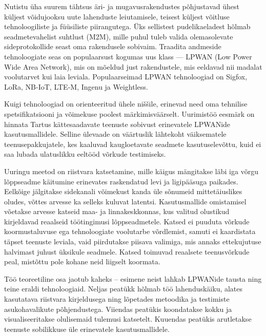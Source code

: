 \documentclass[12pt]{article}
\newcommand{\TODO}{\todo[inline]}
\begin{document}
Nutistu üha suurem tähtsus äri- ja mugavusrakendustes põhjustavad ühest küljest võidujooksu uute lahenduste leiutamisele, teisest küljest võitluse tehnoloogiliste ja füüsiliste piirangutega.
Üks sellistest pudelikaeladest hõlmab seadmetevahelist suhtlust (M2M), mille puhul tuleb valida olemasolevate sideprotokollide seast oma rakendusele sobivaim.
Traadita andmeside tehnoloogiate seas on populaarsust kogumas uus klass — LPWAN (Low Power Wide Area Network), mis on mõeldud just rakendustele, mis eeldavad nii madalat voolutarvet kui laia leviala.
Populaarseimad LPWAN tehnoloogiad on Sigfox, LoRa, NB-IoT, LTE-M, Ingenu ja Weightless.

Kuigi tehnoloogiad on orienteeritud ühele niššile, erinevad need oma tehnilise spetsifikatsiooni ja võimekuse poolest märkimisväärselt.
Uurimistöö eesmärk on hinnata Tartus kättesaadavate teenuste sobivust erinevatele LPWANide kasutusmallidele.
Selline ülevaade on väärtuslik lähtekoht väiksematele teenusepakkujatele, kes kaaluvad kaugloetavate seadmete kasutuselevõttu, kuid ei saa lubada ulatuslikku eeltööd võrkude testimiseks.

Uuringu meetod on riistvara katsetamine, mille käigus mängitakse läbi iga võrgu lõppseadme käitumine erinevates raskendatud levi ja ligipääsuga paikades.
Eelkõige jälgitakse sidekanali võimekust kanda üle sõnumeid mittetäiuslikes oludes, võttes arvesse ka selleks kuluvat latentsi.
Kasutusmallide omistamisel võetakse arvesse katseid maa- ja linnakeskkonnas, kus valitud olustikud kirjeldavad reaalseid töötingimusi lõppseadmetele.
Katsed ei puuduta võrkude koormustaluvuse ega tehnoloogiate voolutarbe võrdlemist, samuti ei kaardistata täpset teenuste leviala, vaid piirdutakse piisava valimiga, mis annaks ettekujutuse halvimast juhust üksikule seadmele.
Katsed toimuvad reaalsete teenusvõrkude peal, mistõttu pole kohane neid liigselt koormata.

Töö teoreetiline osa jaotub kaheks -- esimene neist lahkab LPWANide tausta ning teine eraldi tehnoloogiaid.
Neljas peatükk hõlmab töö lahenduskäiku, alates kasutatava riistvara kirjeldusega ning lõpetades metoodika ja testimiste asukohavalikute põhjendustega.
Viiendas peatükis koondatakse kokku ja visualiseeritakse olulisemaid tulemusi katsetelt.
Kuuendas peatükis arutletakse teenuste sobilikkuse üle erinevatele kasutusmallidele.
\end{document}
